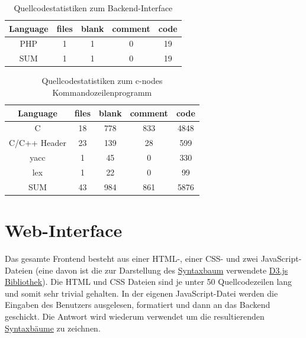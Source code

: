 \documentclass[oneside]{ausarbeitung}
\begin{document}
\begin{table}
\begin{center}
\begin{tabular}{|c || c | c | c | c |} 
 \hline
 \textbf{Language} & \textbf{files} & \textbf{blank} & \textbf{comment} & \textbf{code} \\
 \hline
 PHP & 1 & 1 & 0 & 19 \\
 \hline
\hline
SUM & 1 & 1 & 0 & 19 \\
\hline
\end{tabular}
\end{center}
\caption{Quellcodestatistiken zum Backend-Interface}
\label{tab:stats_php}
\end{table}

\begin{table}
\begin{center}
\begin{tabular}{|c || c | c | c | c |} 
 \hline
 \textbf{Language} & \textbf{files} & \textbf{blank} & \textbf{comment} & \textbf{code} \\
 \hline
 C & 18 & 778 & 833 & 4848 \\ 
 \hline
 C/C++ Header & 23 & 139 & 28 & 599 \\
 \hline
yacc & 1 & 45 & 0 & 330 \\
 \hline
lex & 1 & 22 & 0 & 99\\
 \hline
\hline
SUM & 43 & 984 & 861 & 5876 \\
\hline
\end{tabular}
\end{center}
\caption{Quellcodestatistiken zum c-nodes Kommandozeilenprogramm}
\label{tab:stats_backend}
\end{table}

\section{Web-Interface}
\label{sec:frontend}
Das gesamte Frontend besteht aus einer HTML-, einer CSS- und zwei JavaScript-Dateien (eine davon ist die zur Darstellung des \hyperref[sub:syntax_tree]{Syntaxbaum} verwendete \hyperref[sub:d3js]{D3.js Bibliothek}). Die HTML und CSS Dateien sind je unter 50 Quellcodezeilen lang und somit sehr trivial gehalten. In der eigenen JavaScript-Datei werden die Eingaben des Benutzers ausgelesen, formatiert und dann an das Backend geschickt. Die Antwort wird wiederum verwendet um die resultierenden \hyperref[sub:syntax_tree]{Syntaxbäume} zu zeichnen.
\end{document}
